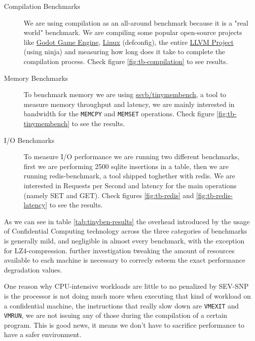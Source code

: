 \documentclass[twocolumn]{article}
\begin{document}
\begin{description}
    \item[Compilation Benchmarks] We are using compilation as an all-around benchmark because it is a "real world" benchmark. We are compiling some popular open-source projects like \href{https://github.com/godotengine/godot}{Godot Game Engine}, \href{https://git.kernel.org/pub/scm/linux/kernel/git/torvalds/linux.git}{Linux} (defconfig), the entire \href{https://github.com/llvm/llvm-project}{LLVM Project} (using ninja) and measuring how long does it take to complete the compilation process. Check figure \ref{fig:tb-compilation} to see results.
    \item[Memory Benchmarks] To benchmark memory we are using \href{https://github.com/ssvb/tinymembench}{ssvb/tinymembench}, a tool to measure memory throughput and latency, we are mainly interested in bandwidth for the \texttt{MEMCPY} and \texttt{MEMSET} operations. Check figure \ref{fig:tb-tinymembench} to see the results.
    \item[I/O Benchmarks] To measure I/O performance we are running two different benchmarks, first we are performing 2500 sqlite insertions in a table, then we are running redis-benchmark, a tool shipped toghether with redis. We are interested in Requests per Second and latency for the main operations (namely SET and GET). Check figures \ref{fig:tb-redis} and \ref{fig:tb-redis-latency} to see the results.
\end{description}

As we can see in table \ref{tab:tinyben-results} the overhead introduced by the usage of Confidential Computing technology across the three categories of benchmarks is generally mild, and negligible in almost every benchmark, with the exception for LZ4-compression. further investigation tweaking the amount of resources available to each machine is necessary to correcly esteem the exact performance degradation values.

One reason why CPU-intensive workloads are little to no penalized by SEV-SNP is the processor is not doing much more when executing that kind of workload on a confidential machine, the instructions that really slow down are \texttt{VMEXIT} and \texttt{VMRUN}, we are not issuing any of those during the compilation of a certain program. This is good news, it means we don't have to sacrifice performance to have a safer environment.
\end{document}
